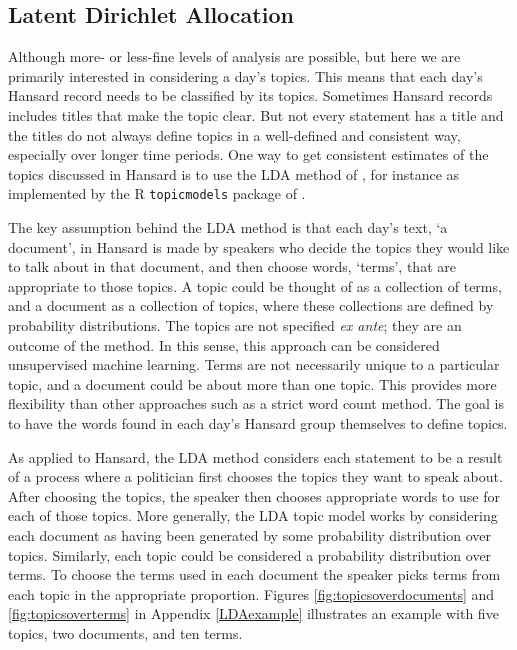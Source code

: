 \documentclass[12pt,]{article}
\theoremstyle{definition}
\theoremstyle{definition}
\theoremstyle{definition}
\theoremstyle{remark}
\begin{document}
\subsection{Latent Dirichlet
Allocation}\label{latent-dirichlet-allocation}

Although more- or less-fine levels of analysis are possible, but here we
are primarily interested in considering a day's topics. This means that
each day's Hansard record needs to be classified by its topics.
Sometimes Hansard records includes titles that make the topic clear. But
not every statement has a title and the titles do not always define
topics in a well-defined and consistent way, especially over longer time
periods. One way to get consistent estimates of the topics discussed in
Hansard is to use the LDA method of \citet{Blei2003latent}, for instance
as implemented by the R \texttt{topicmodels} package of
\citet{Grun2011}.

The key assumption behind the LDA method is that each day's text, `a
document', in Hansard is made by speakers who decide the topics they
would like to talk about in that document, and then choose words,
`terms', that are appropriate to those topics. A topic could be thought
of as a collection of terms, and a document as a collection of topics,
where these collections are defined by probability distributions. The
topics are not specified \emph{ex ante}; they are an outcome of the
method. In this sense, this approach can be considered unsupervised
machine learning. Terms are not necessarily unique to a particular
topic, and a document could be about more than one topic. This provides
more flexibility than other approaches such as a strict word count
method. The goal is to have the words found in each day's Hansard group
themselves to define topics.

As applied to Hansard, the LDA method considers each statement to be a
result of a process where a politician first chooses the topics they
want to speak about. After choosing the topics, the speaker then chooses
appropriate words to use for each of those topics. More generally, the
LDA topic model works by considering each document as having been
generated by some probability distribution over topics. Similarly, each
topic could be considered a probability distribution over terms. To
choose the terms used in each document the speaker picks terms from each
topic in the appropriate proportion. Figures
\ref{fig:topicsoverdocuments} and \ref{fig:topicsoverterms} in Appendix
\ref{LDAexample} illustrates an example with five topics, two documents,
and ten terms.
\end{document}
